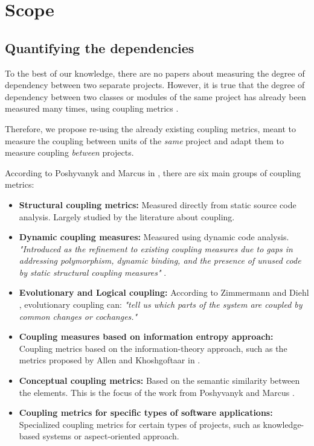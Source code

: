 \section{Scope}\label{section:scope}
\subsection{Quantifying the dependencies}
To the best of our knowledge, there are no papers about measuring the degree of dependency between two separate projects. However, it is true that the degree of dependency between two classes or modules of the same project has already been measured many times, using coupling metrics \cite{briand1999unified}.

Therefore, we propose re-using the already existing coupling metrics, meant to measure the coupling between units of the \textit{same} project and adapt them to measure coupling \textit{between} projects.

\blankl
According to Poshyvanyk and Marcus in \cite{poshyvanyk2006conceptual}, there are six main groups of coupling metrics:

\begin{itemize}
  \item \textbf{Structural coupling metrics:} Measured directly from static source code analysis. Largely studied by the literature about coupling.

  \item \textbf{Dynamic coupling measures:} Measured using dynamic code analysis. \textit{"Introduced as the refinement to existing coupling measures due to gaps in addressing polymorphism, dynamic binding, and the presence of unused code by static structural coupling measures"} \cite{poshyvanyk2006conceptual}.

  \item \textbf{Evolutionary and Logical coupling:} According to Zimmermann and Diehl \cite{zimmermann2005mining}, evolutionary coupling can: \textit{"tell us which parts of the system are coupled by common changes or cochanges."}

  \item \textbf{Coupling measures based on information entropy approach:} Coupling metrics based on the information-theory approach, such as the metrics proposed by Allen and Khoshgoftaar in \cite{allen1999measuring}.

  \item \textbf{Conceptual coupling metrics:} Based on the semantic similarity between the elements. This is the focus of the work from Poshyvanyk and Marcus \cite{poshyvanyk2006conceptual}.

  \item \textbf{Coupling metrics for specific types of software applications:} Specialized coupling metrics for certain types of projects, such as knowledge-based systems or aspect-oriented approach.
\end{itemize}

